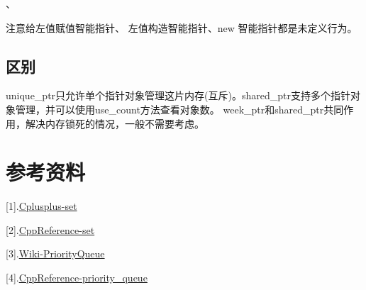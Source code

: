 \documentclass{article}
\begin{document}
    、

    注意给左值赋值智能指针、 左值构造智能指针、new 智能指针都是未定义行为。 

    \subsection{区别}
    unique_ptr只允许单个指针对象管理这片内存(互斥)。shared_ptr支持多个指针对象管理，并可以使用use_count方法查看对象数。
    week_ptr和shared_ptr共同作用，解决内存锁死的情况，一般不需要考虑。

    


    \section*{参考资料}

    [1].\href{https://cplusplus.com/reference/set/set/}{Cplusplus-set}

    [2].\href{https://en.cppreference.com/w/cpp/container/set}{CppReference-set}

    [3].\href{https://en.wikipedia.org/wiki/Priority_queue}{Wiki-PriorityQueue}

    [4].\href{https://en.cppreference.com/w/cpp/container/priority_queue}{CppReference-priority\_queue}
    
\end{document}

